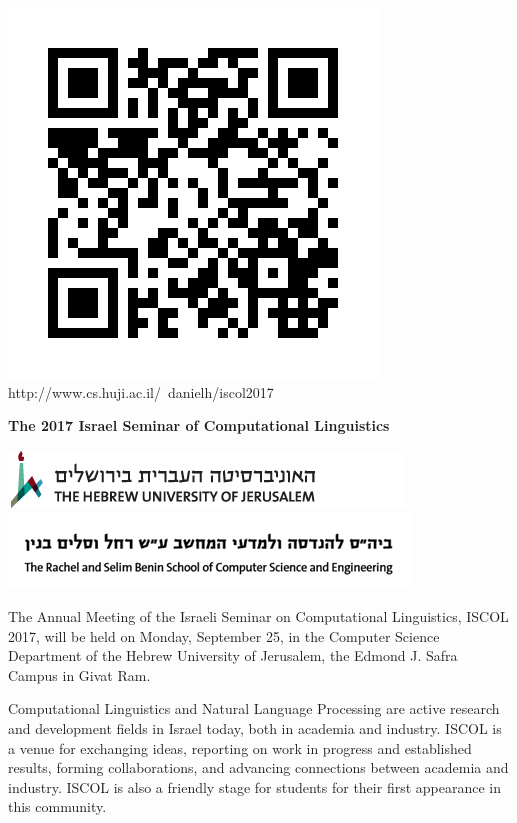 \documentclass[a0,portrait]{a0poster}
\begin{document}
\includegraphics{img/qr_code.jpg}
http://www.cs.huji.ac.il/~danielh/iscol2017

\begin{center}
	\veryHuge \color{NavyBlue} \textbf{The 2017 Israel Seminar of Computational
Linguistics}
\end{center}

\vspace{1cm}
\titlespacing*{\section}{0pt}{8mm}{5mm}

\includegraphics{img/huji_banner.png}
\includegraphics{img/cse_banner.png}

The Annual Meeting of the Israeli Seminar on Computational Linguistics,
ISCOL 2017, will be held on Monday, September 25, in the Computer
Science Department of the Hebrew University of Jerusalem, the Edmond J.
Safra Campus in Givat Ram.


Computational Linguistics and Natural Language Processing are active
research and development fields in Israel today, both in academia and
industry. ISCOL is a venue for exchanging ideas, reporting on work in
progress and established results, forming collaborations, and advancing
connections between academia and industry. ISCOL is also a friendly
stage for students for their first appearance in this community.
\end{document}
